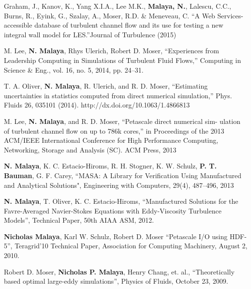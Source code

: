 %

 Graham, J., Kanov, K., Yang X.I.A., Lee M.K., \textbf{Malaya, N.}, 
Lalescu, C.C., Burns, R., Eyink, G., Szalay, A., Moser, R.D. \& 
Meneveau, C. ``A Web Services-accessible database of turbulent channel
flow and its use for testing a new integral wall model for LES.''Journal
of Turbulence  (2015)

\blankline

M. Lee, \textbf{N. Malaya}, Rhys Ulerich, Robert D. Moser,  “Experiences from
Leadership Computing in Simulations of Turbulent Fluid Flows,”
Computing in Science \& Eng., vol. 16, no. 5, 2014, pp. 24–31.

\blankline

T. A. Oliver, \textbf{N. Malaya}, R. Ulerich, and R. D. Moser, “Estimating
uncertainties in statistics computed from direct numerical simulation,”
Phys. Fluids 26, 035101 (2014). http://dx.doi.org/10.1063/1.4866813 

\blankline

M. Lee, \textbf{N. Malaya}, and R. D. Moser, ``Petascale direct numerical sim-
ulation of turbulent channel flow on up to 786k cores,'' in Proceedings
of the 2013 ACM/IEEE International Conference for High Performance
Computing, Networking, Storage and Analysis (SC). ACM Press, 2013 

\blankline

\textbf{N. Malaya}, K. C. Estacio-Hiroms, R. H. Stogner, K. W. Schulz, \textbf{P. T. Bauman},
G. F. Carey, ``MASA: A Library for Verification Using Manufactured and
Analytical Solutions", Engineering with Computers, 29(4), 487--496, 2013

\blankline

\textbf{N. Malaya}, T. Oliver, K. C. Estacio-Hiroms, ``Manufactured Solutions for
the Favre-Averaged Navier-Stokes Equations 
with Eddy-Viscosity Turbulence Models'', Technical Paper, 50th AIAA ASM, 2012.

\blankline

\textbf{Nicholas Malaya}, Karl W. Schulz, Robert D. Moser
``Petascale I/O using HDF-5'', Teragrid'10 Technical Paper, Association for Computing Machinery,
August 2, 2010.

\blankline

Robert D. Moser, \textbf{Nicholas P. Malaya}, Henry Chang, et. al.,
``Theoretically based optimal large-eddy simulations'', Physics of Fluids, October 23, 2009.

